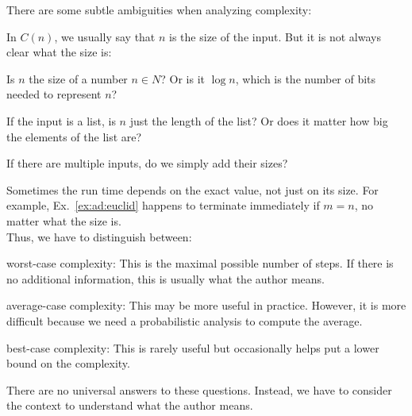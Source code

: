 There are some subtle ambiguities when analyzing complexity:
\begin{compactitem}
 \item In $C(n)$, we usually say that $n$ is the size of the input.
 But it is not always clear what the size is:
  \begin{compactitem}
  \item Is $n$ the size of a number $n\in N$? Or is it $\log n$, which is the number of bits needed to represent $n$?
  \item If the input is a list, is $n$ just the length of the list? Or does it matter how big the elements of the list are?
  \item If there are multiple inputs, do we simply add their sizes?
  \end{compactitem}
\item Sometimes the run time depends on the exact value, not just on its size.
 For example, Ex.~\ref{ex:ad:euclid} happens to terminate immediately if $m=n$, no matter what the size is.\\
 Thus, we have to distinguish between:
  \begin{compactitem}
  \item worst-case complexity: This is the maximal possible number of steps. If there is no additional information, this is usually what the author means.
  \item average-case complexity: This may be more useful in practice. However, it is more difficult because we need a probabilistic analysis to compute the average.
  \item best-case complexity: This is rarely useful but occasionally helps put a lower bound on the complexity.
  \end{compactitem}
\end{compactitem}
There are no universal answers to these questions.
Instead, we have to consider the context to understand what the author means.

